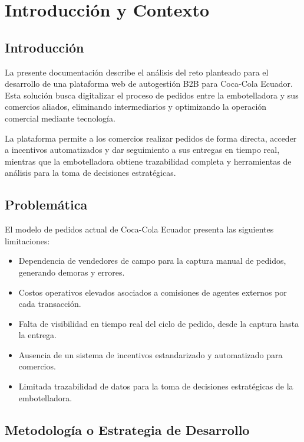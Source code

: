 \documentclass[12pt, a4paper]{report}
\begin{document}
\chapter{Introducción y Contexto}

\section{Introducción}

La presente documentación describe el análisis del reto planteado para el desarrollo de una plataforma web de autogestión B2B para Coca-Cola Ecuador. Esta solución busca digitalizar el proceso de pedidos entre la embotelladora y sus comercios aliados, eliminando intermediarios y optimizando la operación comercial mediante tecnología.

La plataforma permite a los comercios realizar pedidos de forma directa, acceder a incentivos automatizados y dar seguimiento a sus entregas en tiempo real, mientras que la embotelladora obtiene trazabilidad completa y herramientas de análisis para la toma de decisiones estratégicas.

\section{Problemática}

El modelo de pedidos actual de Coca-Cola Ecuador presenta las siguientes limitaciones:

\begin{itemize}
  \item Dependencia de vendedores de campo para la captura manual de pedidos, generando demoras y errores.
  \item Costos operativos elevados asociados a comisiones de agentes externos por cada transacción.
  \item Falta de visibilidad en tiempo real del ciclo de pedido, desde la captura hasta la entrega.
  \item Ausencia de un sistema de incentivos estandarizado y automatizado para comercios.
  \item Limitada trazabilidad de datos para la toma de decisiones estratégicas de la embotelladora.
\end{itemize}

\section{Metodología o Estrategia de Desarrollo}
\end{document}
